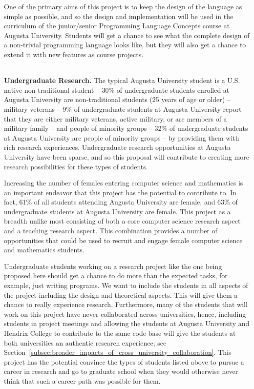 One of the primary aims of this project is to keep the design of the
language as simple as possible, and so the design and implementation
will be used in the curriculum of the junior/senior Programming
Language Concepts course at Augusta University.  Students will get a
chance to see what the complete design of a non-trivial programming
language looks like, but they will also get a chance to extend it with
new features as course projects.

\ \\
\noindent
\textbf{Undergraduate Research.}  The typical Augusta University
student is a U.S. native non-traditional student -- 30\% of
undergraduate students enrolled at Augusta University are
non-traditional students (25 years of age or older) -- military
veterans -- 9\% of undergraduate students at Augusta University report
that they are either military veterans, active military, or are
members of a military family -- and people of minority groups -- 32\%
of undergraduate students at Augusta University are people of minority
groups -- by providing them with rich research
experiences. Undergraduate research opportunities at Augusta
University have been sparse, and so this proposal will contribute to
creating more research possibilities for these types of students.


Increasing the number of females entering computer science and
mathematics is an important endeavor that this project has the
potential to contribute to.  In fact, 61\% of all students attending
Augusta University are female, and 63\% of undergraduate students at
Augusta University are female.  This project as a breadth unlike most
consisting of both a core computer science research aspect and a
teaching research aspect.  This combination provides a number of
opportunities that could be used to recruit and engage female computer
science and mathematics students.

Undergraduate students working on a research project like the one
being proposed here should get a chance to do more than the expected
tasks, for example, just writing programs.  We want to include the
students in all aspects of the project including the design and
theoretical aspects.  This will give them a chance to really
experience research.  Furthermore, many of the students that will work
on this project have never collaborated across universities, hence,
including students in project meetings and allowing the students at
Augusta University and Hendrix College to contribute to the same code
base will give the students at both universities an authentic research
experience; see
Section~\ref{subsec:broader_impacts_of_cross_university_collaboration}. This
project has the potential convince the types of students listed above
to pursue a career in research and go to graduate school when they
would otherwise never think that such a career path was possible for
them.

